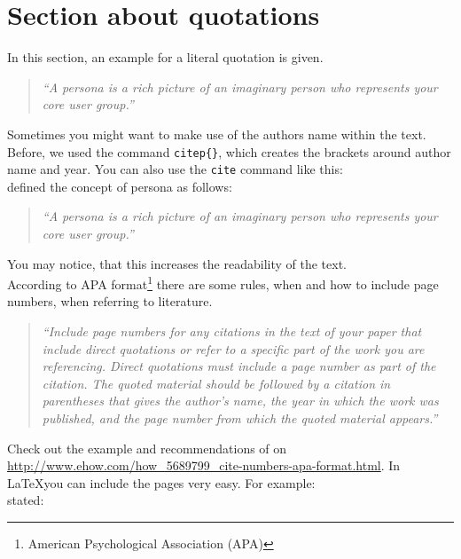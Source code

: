 \documentclass[a4paper]{article}
\begin{document}
\section{Section about quotations} %
\label{sec:section_about_quotations}

In this section, an example for a literal quotation is given. 

\begin{quotation}
	\emph{``A persona is a rich picture of an imaginary person who represents your core user group.''}
	\citep{Dix04}
\end{quotation}

Sometimes you might want to make use of the authors name within the text. Before, we used the command \texttt{citep\{\}}, which creates the brackets around author name and year. You can also use the \texttt{cite} command like this: \\

\cite{Dix04} defined the concept of persona as follows: 
\begin{quotation}
	\emph{``A persona is a rich picture of an imaginary person who represents your core user group.''}
	\citep{Dix04}
\end{quotation}

You may notice, that this increases the readability of the text. \\

According to APA format\footnote{ American Psychological Association (APA)} there are some rules, when and how to include page numbers, when referring to literature. 

\begin{quotation}
	\emph{``Include page numbers for any citations in the text of your paper that include direct quotations or refer to a specific part of the work you are referencing. Direct quotations must include a page number as part of the citation. The quoted material should be followed by a citation in parentheses that gives the author's name, the year in which the work was published, and the page number from which the quoted material appears.''}
	\citep{Hall}
\end{quotation}

Check out the example and recommendations of \cite{Hall} on \url{http://www.ehow.com/how_5689799_cite-numbers-apa-format.html}. In \LaTeX you can include the pages very easy. For example: \\

\citet[p. 86]{Baddeley:1974ts} stated: 
\end{document}
